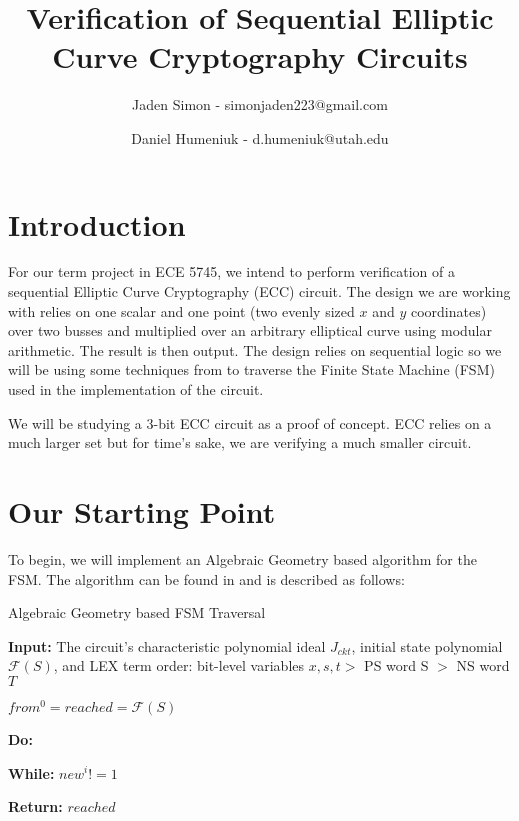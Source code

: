 \documentclass[12pt]{report}
\title{Verification of Sequential Elliptic Curve Cryptography Circuits}
\author{Jaden Simon - simonjaden223@gmail.com \\ \and
	   Daniel Humeniuk - d.humeniuk@utah.edu}
\begin{document}
\maketitle

\section{Introduction}

For our term project in ECE 5745, we intend to perform verification of a sequential Elliptic Curve Cryptography (ECC) circuit. The design we are working with relies on  one scalar and one point (two evenly sized $x$ and $y$ coordinates) over two busses and multiplied over an arbitrary elliptical curve using modular arithmetic. The result is then output. The design relies on sequential logic so we will be using some techniques from \cite{Kalla} to traverse the Finite State Machine (FSM) used in the implementation of the circuit.

We will be studying a 3-bit ECC circuit as a proof of concept. ECC relies on a much larger set but for time's sake, we are verifying a much smaller circuit. 

\section{Our Starting Point}

To begin, we will implement an Algebraic Geometry based algorithm for the FSM. The algorithm can be found in \cite{Kalla} and is described as follows:

\begin{algorithm}
\caption{Algebraic Geometry based FSM Traversal}

{\textbf{Input:} The circuit's characteristic polynomial ideal $J_{ckt}$, initial state polynomial $\mathcal{F}(S)$, and LEX term order: bit-level variables $x,s,t >$ PS word S $>$ NS word $T$}

{$from^0=reached=\mathcal{F}(S)$}

{\textbf{Do:}}

\hspace*{6mm}{$i \leftarrow i + 1 $}




\hspace*{6mm}{$reached \leftarrow reached*new^i$}

\hspace*{6mm}{$from^i \leftarrow new^i(S$/$T)$}

{\textbf{While:} $new^i != 1$}

{\textbf{Return:} $reached$}

\end{algorithm}
\end{document}
